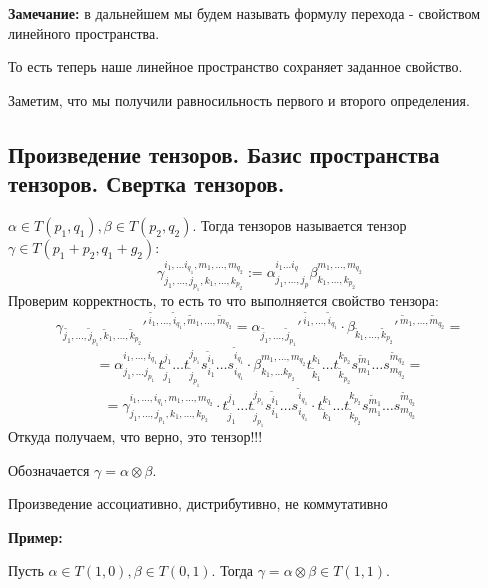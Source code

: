 \textbf{Замечание:} в дальнейшем мы будем называть формулу перехода - свойством линейного пространства.

То есть теперь наше линейное пространство сохраняет заданное свойство.


Заметим, что мы получили равносильность первого и второго определения.

\newpage
\subsection{Произведение тензоров. Базис пространства тензоров. Свертка тензоров.}

 $\alpha \in T(p_1,q_1),\beta \in T(p_2,q_2)$. Тогда  тензоров называется тензор $\gamma \in T(p_1+p_2,q_1+g_2):$ 
$$\gamma^{i_1,\ldots i_{q_1},m_1,\ldots,m_{q_2}}_{j_1,\ldots,j_{p_1},k_1,\ldots, k_{p_2}}:= \alpha^{i_1\ldots i_q}_{j_1,\ldots,j_p} \beta^{m_1,\ldots,m_{q_2}}_{k_1,\ldots, k_{p_2}}$$
Проверим корректность, то есть то что выполняется свойство тензора:
$$\gamma_{\widetilde{j_1},\ldots,\widetilde{j}_{p_1}, \widetilde{k}_1,\ldots, \widetilde{k}_{p_2}}'^{\, \widetilde{i_1},\ldots,\widetilde{i}_{q_1}, \widetilde{m}_1,\ldots, \widetilde{m}_{q_2}} = \alpha_{\widetilde{j_1},\ldots,\widetilde{j}_{p_1}}'^{\, \widetilde{i_1},\ldots,\widetilde{i}_{q_1}} \cdot \beta_{ \widetilde{k}_1,\ldots, \widetilde{k}_{p_2}}'^{\,\widetilde{m}_1,\ldots, \widetilde{m}_{q_2}} = $$
$$= \alpha_{j_1,\ldots j_{p_1}}^{i_1,\ldots, i_{q_1}} t_{\widetilde{j}_1}^{j_1}\ldots t_{\widetilde{j}_{p_1}}^{j_{p_1}} s_{i_1}^{\widetilde{i}_1}\ldots s_{i_{q_1}}^{\widetilde{i}_{q_1}}\cdot \beta_{k_1,\ldots k_{p_2}}^{m_1,\ldots, m_{q_2}} t_{\widetilde{k}_1}^{k_1}\ldots t_{\widetilde{k}_{p_2}}^{k_{p_2}} s_{m_1}^{\widetilde{m}_1}\ldots s_{m_{q_2}}^{\widetilde{m}_{q_2}} = $$
$$=\gamma_{j_1,\ldots,j_{p_1},k_1,\ldots , k_{p_2}}^{i_1,\ldots, i_{q_1}, m_1,\ldots,m_{q_2}}\cdot t_{\widetilde{j}_1}^{j_1}\ldots t_{\widetilde{j}_{p_1}}^{j_{p_1}} s_{i_1}^{\widetilde{i}_1}\ldots s_{i_{q_1}}^{\widetilde{i}_{q_1}}\cdot t_{\widetilde{k}_1}^{k_1}\ldots t_{\widetilde{k}_{p_2}}^{k_{p_2}} s_{m_1}^{\widetilde{m}_1}\ldots s_{m_{q_2}}^{\widetilde{m}_{q_2}}$$
Откуда получаем, что верно, это тензор!!!

Обозначается $\gamma = \alpha \otimes \beta$.

Произведение ассоциативно, дистрибутивно, не коммутативно



\textbf{Пример:}

Пусть $\alpha \in T(1,0), \beta \in T(0,1)$. Тогда $\gamma = \alpha \otimes \beta  \in T(1,1)$.

